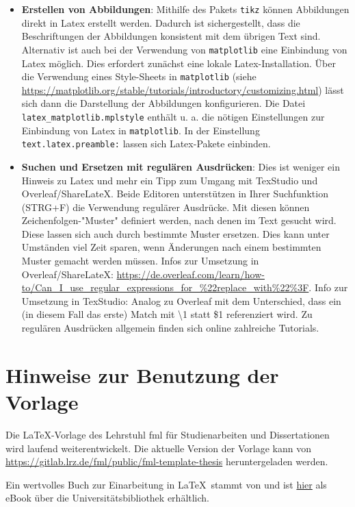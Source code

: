 \begin{itemize}
	\item \textbf{Erstellen von Abbildungen}: Mithilfe des Pakets \verb|tikz| können Abbildungen direkt in Latex erstellt werden. Dadurch ist sichergestellt, dass die Beschriftungen der Abbildungen konsistent mit dem übrigen Text sind. Alternativ ist auch bei der Verwendung von \verb|matplotlib| eine Einbindung von Latex möglich. Dies erfordert zunächst eine lokale Latex-Installation. Über die Verwendung eines Style-Sheets in \verb|matplotlib| (siehe \url{https://matplotlib.org/stable/tutorials/introductory/customizing.html}) lässt sich dann die Darstellung der Abbildungen konfigurieren. Die Datei \verb|latex_matplotlib.mplstyle| enthält u. a. die nötigen Einstellungen zur Einbindung von Latex in \verb|matplotlib|. In der Einstellung \verb|text.latex.preamble:| lassen sich Latex-Pakete einbinden.
	\item \textbf{Suchen und Ersetzen mit regulären Ausdrücken}: Dies ist weniger ein Hinweis zu Latex und mehr ein Tipp zum Umgang mit TexStudio und Overleaf/ShareLateX. Beide Editoren unterstützen in Ihrer Suchfunktion (STRG+F) die Verwendung regulärer Ausdrücke. Mit diesen können Zeichenfolgen-"Muster" definiert werden, nach denen im Text gesucht wird. Diese lassen sich auch durch bestimmte Muster ersetzen. Dies kann unter Umständen viel Zeit sparen, wenn Änderungen nach einem bestimmten Muster gemacht werden müssen.  Infos zur Umsetzung in Overleaf/ShareLateX: \url{https://de.overleaf.com/learn/how-to/Can_I_use_regular_expressions_for_%22replace_with%22%3F}. Info zur Umsetzung in TexStudio: Analog zu Overleaf mit dem Unterschied, dass ein (in diesem Fall das erste) Match mit \textbackslash1 statt \$1 referenziert wird. Zu regulären Ausdrücken allgemein finden sich online zahlreiche Tutorials.
\end{itemize}

\chapter{Hinweise zur Benutzung der Vorlage}
\label{cha:hinweise_vorlage}

Die \LaTeX -Vorlage des Lehrstuhl fml für Studienarbeiten und Dissertationen wird laufend weiterentwickelt. Die aktuelle Version der Vorlage kann von \url{https://gitlab.lrz.de/fml/public/fml-template-thesis} heruntergeladen werden.

Ein wertvolles Buch zur Einarbeitung in \LaTeX \ stammt von \textcite{Sch-2017} und ist  \href{https://opac.ub.tum.de/TouchPoint/perma.do?q=+0\%3D\%22ZDB-30-ORH-047769556\%22+IN+\%5B2\%5D&v=tum&l=de}{hier} als eBook über die Universitätsbibliothek erhältlich.

